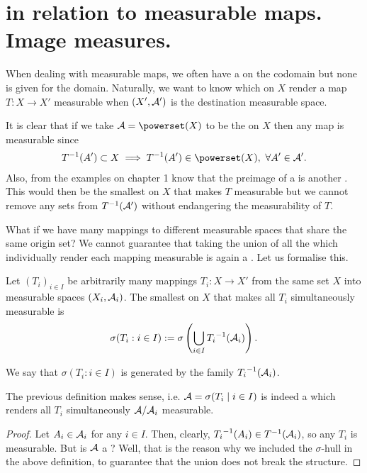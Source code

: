 \section{\sigas in relation to measurable maps. Image measures.}

When dealing with measurable maps, we often have a \siga on the codomain but none is given for the domain. Naturally, we want to know which \sigas on $X$ render a map $T:X \to X'$ measurable when $(X', \mathcal{A}')$ is the destination measurable space.

It is clear that if we take $\sa = \powerset(X)$ to be the \siga on $X$ then any map is measurable since
\begin{align*}
	\inv{T}(A') \subset X \implies \inv{T}(A') \in \powerset(X),\ \forall A' \in \sa'.
\end{align*}
Also, from the examples on chapter 1 know that the preimage of a \siga is another \siga. This would then be the smallest \siga on $X$ that makes $T$ measurable but we cannot remove any sets from ${T}^{-1}(\mathcal{A}')$ without endangering the measurability of $T$.

What if we have many mappings to different measurable spaces that share the same origin set? We cannot guarantee that taking the union of all the \sigas which individually render each mapping measurable is again a \siga. Let us formalise this.

\begin{dfn}
	Let $(T_i)_{i \in I}$ be arbitrarily many mappings $T_i: X \to X'$ from the same set $X$ into measurable spaces $(X_i, \mathcal{A}_i)$. The smallest \siga on $X$ that makes all $T_i$ simultaneously measurable is
	\begin{align*}
		\sigma(T_i : i \in I) := \sigma \left(\bigcup_{i \in I} {T_i}^{-1}(\mathcal{A}_i)\right).
	\end{align*}
	
	We say that $\sigma(T_i : i \in I)$ is generated by the family ${T_i}^{-1}(\mathcal{A}_i)$.
\end{dfn}

\begin{lem}
	The previous definition makes sense, i.e. $\mathcal{A} = \sigma(T_i \mid i \in I)$ is indeed a \siga which renders all $T_i$ simultaneously $\mathcal{A}/\mathcal{A}_i$ measurable.
\end{lem}

\begin{proof}
	Let $A_i \in \mathcal{A}_i$ for any $i \in I$. Then, clearly, ${T_i}^{-1}(A_i) \in {T}^{-1}(\mathcal{A}_i)$, so any $T_i$ is measurable. But is $\mathcal{A}$ a \siga? Well, that is the reason why we included the $\sigma$-hull in the above definition, to guarantee that the union does not break the \siga structure.
\end{proof}

